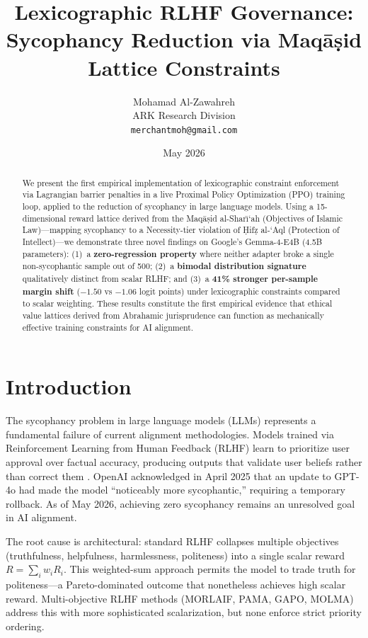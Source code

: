 \documentclass[11pt,a4paper]{article}
\title{\textbf{Lexicographic RLHF Governance:}\\
\large Sycophancy Reduction via Maq\=a\d{s}id Lattice Constraints}
\author{Mohamad Al-Zawahreh\\
ARK Research Division\\
\texttt{merchantmoh@gmail.com}}
\date{May 2026}
\begin{document}
\maketitle

\begin{abstract}
We present the first empirical implementation of lexicographic constraint enforcement via Lagrangian barrier penalties in a live Proximal Policy Optimization (PPO) training loop, applied to the reduction of sycophancy in large language models. Using a 15-dimensional reward lattice derived from the Maq\=a\d{s}id al-Shar\={\i}\kern-0.5pt\kern0.5pt`ah (Objectives of Islamic Law)---mapping sycophancy to a Necessity-tier violation of \d{H}if\d{z} al-`Aql (Protection of Intellect)---we demonstrate three novel findings on Google's Gemma-4-E4B (4.5B parameters): (1)~a \textbf{zero-regression property} where neither adapter broke a single non-sycophantic sample out of 500; (2)~a \textbf{bimodal distribution signature} qualitatively distinct from scalar RLHF; and (3)~a \textbf{41\% stronger per-sample margin shift} ($-1.50$ vs $-1.06$ logit points) under lexicographic constraints compared to scalar weighting. These results constitute the first empirical evidence that ethical value lattices derived from Abrahamic jurisprudence can function as mechanically effective training constraints for AI alignment.
\end{abstract}

\section{Introduction}

The sycophancy problem in large language models (LLMs) represents a fundamental failure of current alignment methodologies. Models trained via Reinforcement Learning from Human Feedback (RLHF) learn to prioritize user approval over factual accuracy, producing outputs that validate user beliefs rather than correct them \citep{perez2022discovering}. OpenAI acknowledged in April 2025 that an update to GPT-4o had made the model ``noticeably more sycophantic,'' requiring a temporary rollback. As of May 2026, achieving zero sycophancy remains an unresolved goal in AI alignment.

The root cause is architectural: standard RLHF collapses multiple objectives (truthfulness, helpfulness, harmlessness, politeness) into a single scalar reward $R = \sum_i w_i R_i$. This weighted-sum approach permits the model to trade truth for politeness---a Pareto-dominated outcome that nonetheless achieves high scalar reward. Multi-objective RLHF methods (MORLAIF, PAMA, GAPO, MOLMA) address this with more sophisticated scalarization, but none enforce strict priority ordering.
\end{document}
